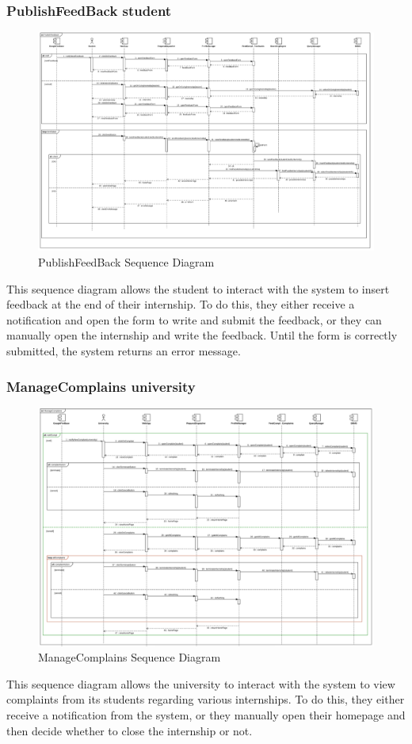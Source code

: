 \documentclass{article}
\begin{document}
\subsubsection{PublishFeedBack student}
\begin{figure}[H]
    \centering
    \includegraphics[width=1\linewidth]{SequenceDiagram/PubFeedSD.png}
    \caption{PublishFeedBack Sequence Diagram}
    \label{fig:enter-label}
\end{figure}
This sequence diagram allows the student to interact with the system to insert feedback at the end of their internship. To do this, they either receive a notification and open the form to write and submit the feedback, or they can manually open the internship and write the feedback. Until the form is correctly submitted, the system returns an error message.

\subsubsection{ManageComplains university}
\begin{figure}[H]
    \centering
    \includegraphics[width=1\linewidth]{SequenceDiagram/ManageComplSD.png}
    \caption{ManageComplains Sequence Diagram}
    \label{fig:enter-label}
\end{figure}
This sequence diagram allows the university to interact with the system to view complaints from its students regarding various internships. To do this, they either receive a notification from the system, or they manually open their homepage and then decide whether to close the internship or not.
\end{document}
